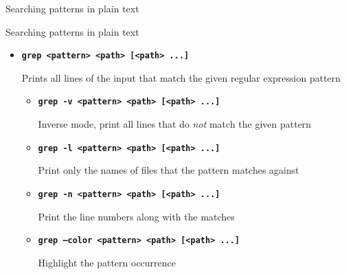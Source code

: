 \documentclass[aspectratio=1610]{beamer}
\newcommand\curtitle{}
\newcommand\command[1]{\alert{\textbf{\texttt{#1}}}}
\begin{document}
\renewcommand\curtitle{Searching patterns in plain text}

\begin{frame}[c]
    \Huge \curtitle
\end{frame}


\begin{frame}[c]{\curtitle}
    \begin{itemize}[<+->]\setlength\itemsep{1em}
        \item \command{grep <pattern> <path> [<path> ...]}

            Prints all lines of the input that match the given \alert{regular expression pattern}
            \pause
            \begin{itemize}[<.->]
                \item \command{grep -v <pattern> <path> [<path> ...]}

                    Inverse mode, print all lines that do \emph{not} match the given pattern
                \item \command{grep -l <pattern> <path> [<path> ...]}

                    Print only the names of files that the pattern matches against
                \item \command{grep -n <pattern> <path> [<path> ...]}

                    Print the line numbers along with the matches
                \item \command{grep --color <pattern> <path> [<path> ...]}

                    Highlight the pattern occurrence
            \end{itemize}
    \end{itemize}
\end{frame}

\end{document}

